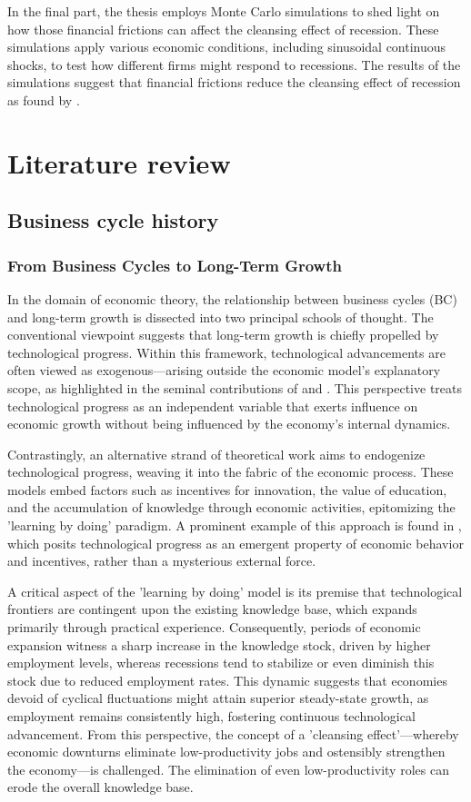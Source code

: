 \documentclass[12pt]{report}
\begin{document}
In the final part, the thesis employs Monte Carlo simulations to shed light on how those financial frictions can affect
the cleansing effect of recession. These simulations apply various economic conditions, including sinusoidal continuous shocks, to test how different
firms might respond to recessions. The results of the simulations suggest that financial frictions reduce the
cleansing effect of recession as found by \cite{CabHarm94}. 
\chapter{Literature review}
\section{Business cycle history}

\subsection{From Business Cycles to Long-Term Growth}

In the domain of economic theory, the relationship between business cycles (BC) and long-term growth is dissected into
two principal schools of thought. The conventional viewpoint suggests that long-term growth is chiefly propelled by
technological progress. Within this framework, technological advancements are often viewed as exogenous—arising outside
the economic model's explanatory scope, as highlighted in the seminal contributions of \cite{Sol56} and \cite{Swa56}.
This perspective treats technological progress as an independent variable that exerts influence on economic growth
without being influenced by the economy's internal dynamics. 

Contrastingly, an alternative strand of theoretical work aims to endogenize technological progress, weaving it into the
fabric of the economic process. These models embed factors such as incentives for innovation, the value of education,
and the accumulation of knowledge through economic activities, epitomizing the 'learning by doing' paradigm. A prominent
example of this approach is found in \cite{Sta90}, which posits technological progress as an emergent property of
economic behavior and incentives, rather than a mysterious external force. 

A critical aspect of the 'learning by doing' model is its premise that technological frontiers are contingent upon the
existing knowledge base, which expands primarily through practical experience. Consequently, periods of economic
expansion witness a sharp increase in the knowledge stock, driven by higher employment levels, whereas recessions tend
to stabilize or even diminish this stock due to reduced employment rates. This dynamic suggests that economies devoid of
cyclical fluctuations might attain superior steady-state growth, as employment remains consistently high, fostering
continuous technological advancement. From this perspective, the concept of a 'cleansing effect'—whereby economic
downturns eliminate low-productivity jobs and ostensibly strengthen the economy—is challenged. The elimination of even
low-productivity roles can erode the overall knowledge base. 
\end{document}
